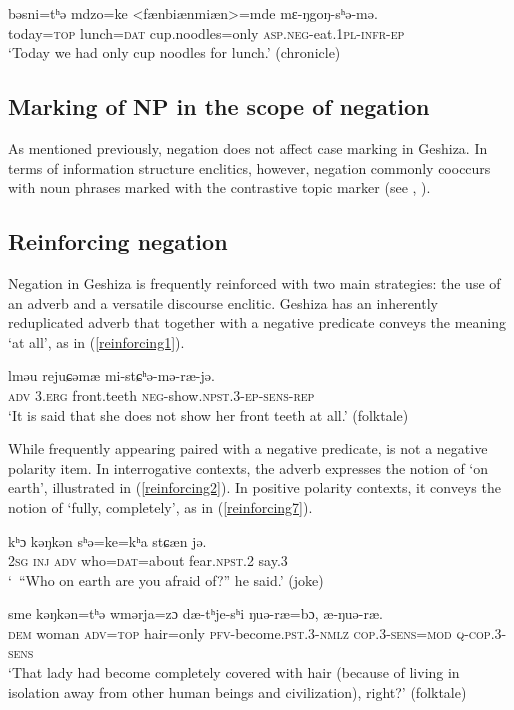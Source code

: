 \documentclass[output=paper,colorlinks,citecolor=brown]{langscibook}
\begin{document}
\ea
\label{only3}
\gll  
{bəsni=tʰə} {mdzo=ke} {<fænbiænmiæn>=mde} {mɛ-ŋgoŋ-sʰə-mə.}\\
today=\textsc{top} lunch=\textsc{dat} cup.noodles=only \textsc{asp.neg}-eat.\textsc{1pl-infr-ep}\\
\glt `Today we had only cup noodles for lunch.' (chronicle)
\z

\subsection{Marking of NP in the scope of negation}
As mentioned previously, negation does not affect case marking in Geshiza. In terms of information structure enclitics, however, negation commonly cooccurs with noun phrases marked with the contrastive topic marker  (see , ).

\subsection{Reinforcing negation}
\label{reforce}
Negation in Geshiza is frequently reinforced with two main strategies: the use of an adverb and a versatile discourse enclitic. Geshiza has an inherently reduplicated adverb  that together with a negative predicate conveys the meaning `at all', as in (\ref{reinforcing1}).

\ea
\label{reinforcing1}
 {lməu} {rejuɕəmæ} {mi-stɕʰə-mə-ræ-jə.}\\
\textsc{adv} \textsc{3.erg} front.teeth \textsc{neg}-show.\textsc{npst}.3-\textsc{ep-sens-rep}\\
\glt `It is said that she does not show her front teeth at all.' (folktale)
\z

While frequently appearing paired with a negative predicate,  is not a negative polarity item. In interrogative contexts, the adverb expresses the notion of `on earth', illustrated in (\ref{reinforcing2}). In positive polarity contexts, it conveys the notion of `fully, completely', as in (\ref{reinforcing7}).

\ea
\label{reinforcing2}
			{kʰɔ}			{kəŋkən}		{sʰə=ke=kʰa}			{stɕæn} 		{jə}.\\
\textsc{2sg} \textsc{inj} \textsc{adv}     who=\textsc{dat}=about fear.\textsc{npst.2} say.3\\
\glt `\ ``Who on earth are you afraid of?'' he said.' (joke)
\z

\ea
\label{reinforcing7}
 {sme} {kəŋkən=tʰə} {wmərja=z}ɔ {dæ-tʰje-sʰi} {ŋuə-ræ=bɔ}, {æ-ŋuə-ræ}.\\
\textsc{dem} woman \textsc{adv}=\textsc{top}     hair=only \textsc{pfv}-become.\textsc{pst}.3-\textsc{nmlz} \textsc{cop}.3-\textsc{sens}=\textsc{mod} \textsc{q}-\textsc{cop}.3-\textsc{sens}\\
\glt `That lady had become completely covered with hair (because of living in isolation away from other human beings and civilization), right?' (folktale)
\z
\end{document}
